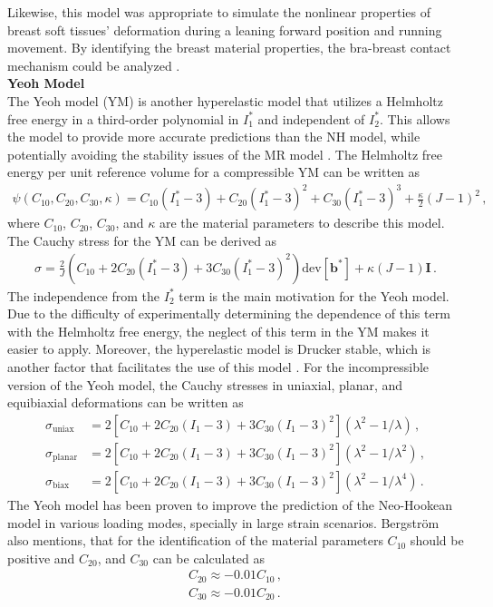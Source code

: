 Likewise, this model was appropriate to simulate the nonlinear properties of breast soft tissues' deformation 
during a leaning forward position and running movement. By identifying the breast material properties, the bra-breast contact mechanism 
could be analyzed \cite{Sun2019}.\\

\textbf{Yeoh Model}\\

The Yeoh model (YM) is another hyperelastic model that utilizes a Helmholtz free energy 
in a third-order polynomial in $I_1^*$ and independent of $I_2^*$. This allows the model to provide 
more accurate predictions than the NH model, while potentially avoiding the stability issues of the 
MR model \cite{Bergström2015}. The Helmholtz free energy per unit reference volume for a compressible YM can be written as
\begin{align}
        \psi(C_{10}, C_{20}, C_{30}, \kappa) = C_{10}(I_1^* - 3) + C_{20}(I_1^* - 3)^2 + C_{30}(I_1^* - 3)^3 + \frac{\kappa}{2}(J - 1)^2 \, ,
        \label{eq:helmholtzYM}
\end{align}
where $C_{10}$, $C_{20}$, $C_{30}$, and $\kappa$ are the material parameters to describe this model. The Cauchy stress 
for the YM can be derived as 
\begin{align}
        \sigma = \frac{2}{J}(C_{10} + 2C_{20}(I_1^* - 3) + 3C_{30}(I_1^* - 3)^2)\text{dev}[\boldsymbol{b}^*] + \kappa(J - 1)\boldsymbol{I}\, .
        \label{eq:cauchystressYM}
\end{align}
The independence from the $I_2^*$ term is the main motivation for the Yeoh model. Due to the difficulty of experimentally 
determining the dependence of this term with the Helmholtz free energy, the neglect of this term in the YM makes 
it easier to apply. Moreover, the hyperelastic model is Drucker stable, which is another factor that facilitates the use of this model \cite{Bergström2015}.
For the incompressible version of the Yeoh model, the Cauchy stresses in uniaxial, planar, and equibiaxial deformations can be written as
\begin{align}
        \sigma_{\text{uniax}} &= 2[C_{10} + 2C_{20}(I_1 - 3) + 3C_{30}(I_1 - 3)^2](\lambda^2 - 1/\lambda) \, , \label{eq:uniaxYM} \\
        \sigma_{\text{planar}} &= 2[C_{10} + 2C_{20}(I_1 - 3) + 3C_{30}(I_1 - 3)^2](\lambda^2 - 1/\lambda^2) \, , \label{eq:planarYM} \\
        \sigma_{\text{biax}} &= 2[C_{10} + 2C_{20}(I_1 - 3) + 3C_{30}(I_1 - 3)^2](\lambda^2 - 1/\lambda^4) \, . \label{eq:biaxyM}
\end{align}
The Yeoh model has been proven to improve the prediction of the Neo-Hookean model in various loading modes, specially in large strain scenarios.
Bergström also mentions, that for the identification of the material parameters $C_{10}$ should be positive and $C_{20}$, and $C_{30}$ 
can be calculated as
\begin{align}
        C_{20} \approx -0.01C_{10} \,, \\
        C_{30} \approx -0.01C_{20} \, .
\end{align}

